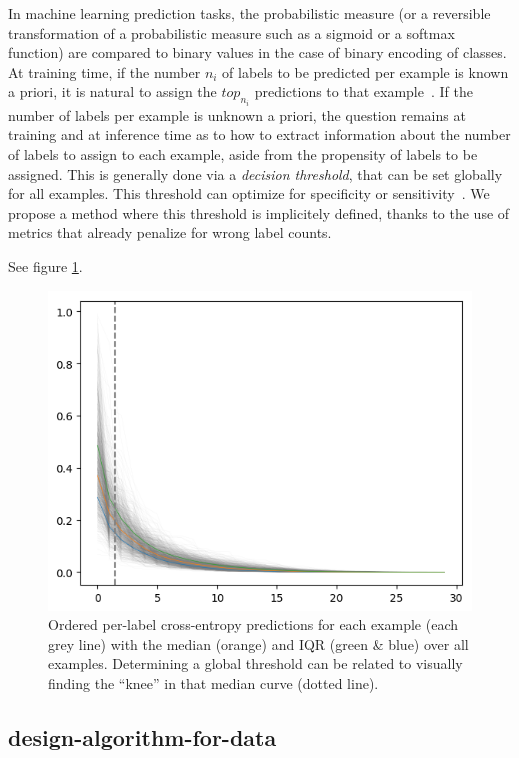 In machine learning prediction tasks, the probabilistic measure (or a reversible
transformation of a probabilistic measure such as a sigmoid or a softmax
function) are compared to binary values in the case of binary encoding of
classes. At training time, if the number $n_i$ of labels to be predicted per
example is known a priori, it is natural to assign the $top_{n_i}$ predictions
to that example~\cite{lossTopKError, topKmulticlassSVM}. If the number of
labels per example is unknown a priori, the question remains at training and at inference time
as to how to extract information about the number of labels to assign to each
example, aside from the propensity of labels to be assigned. This is generally
done via a \emph{decision threshold}, that can be set globally for all
examples. This threshold can optimize for specificity or
sensitivity~\cite{decisionThreshold}. We propose a method where this threshold
is implicitely defined, thanks to the use of metrics that already penalize for
wrong label counts.

See figure \ref{fig:knee}.


\begin{figure}[htbp]
\centering
\includegraphics[width=.9\linewidth]{./images/knee.png}
\caption{\label{fig:knee}
Ordered per-label cross-entropy predictions for each example (each grey line) with the median (orange) and IQR (green \& blue) over all examples. Determining a global threshold can be related to visually finding the ``knee'' in that median curve (dotted line).}
\end{figure}


\subsection{design-algorithm-for-data}

